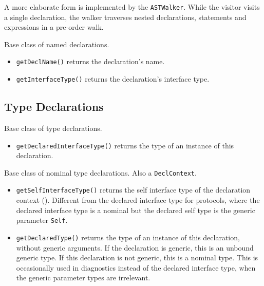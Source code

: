 \documentclass[../generics]{subfiles}
\begin{document}
A more elaborate form is implemented by the \texttt{ASTWalker}. While the visitor visits a single declaration, the walker traverses nested declarations, statements and expressions in a pre-order walk.

Base class of named declarations.

\begin{itemize}
\item \texttt{getDeclName()} returns the declaration's name.
\item \texttt{getInterfaceType()} returns the declaration's interface type.
\end{itemize}

\subsection*{Type Declarations}

Base class of type declarations.
\begin{itemize}
\item \texttt{getDeclaredInterfaceType()} returns the type of an instance of this declaration.
\end{itemize}

Base class of nominal type declarations. Also a \texttt{DeclContext}.
\begin{itemize}
\item \texttt{getSelfInterfaceType()} returns the self interface type of the declaration context (). Different from the declared interface type for protocols, where the declared interface type is a nominal but the declared self type is the generic parameter \texttt{Self}.
\item \texttt{getDeclaredType()} returns the type of an instance of this declaration, without generic arguments. If the declaration is generic, this is an unbound generic type. If this declaration is not generic, this is a nominal type. This is occasionally used in diagnostics instead of the declared interface type, when the generic parameter types are irrelevant.
\end{itemize}
\end{document}
